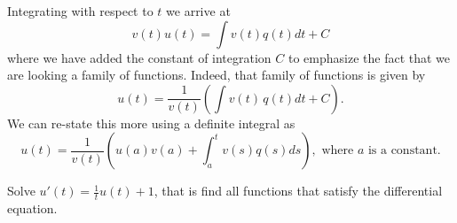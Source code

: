 \documentclass[../book.tex]{subfiles}
\begin{document}
Integrating with respect to \(t\) we arrive at
\begin{equation}\label{eq:de-20}
v(t) u(t) = \int v(t) q(t) dt + C 
\end{equation}
where we have added the constant of integration \(C\) to emphasize the fact that we are looking a family of functions. Indeed, that family of functions is given by
\begin{equation}\label{eq:de-21}
u(t) = \frac{1}{v(t)} \left( \int v(t)\, q(t) dt + C \right).
\end{equation}
We can re-state this more using a definite integral as
\begin{equation}\label{eq:de-22}
u(t) = \frac{1}{v(t)} \left( u(a) v(a) +  \int_{a}^{t} v(s) q(s) ds \right), \text{ where \(a\) is a constant.}
\end{equation}

\begin{example} \label{eg:linear1}
Solve \(u'(t) = \frac{1}{t} u(t) + 1\), that is find all functions that satisfy the differential equation.
\end{example}
\end{document}
